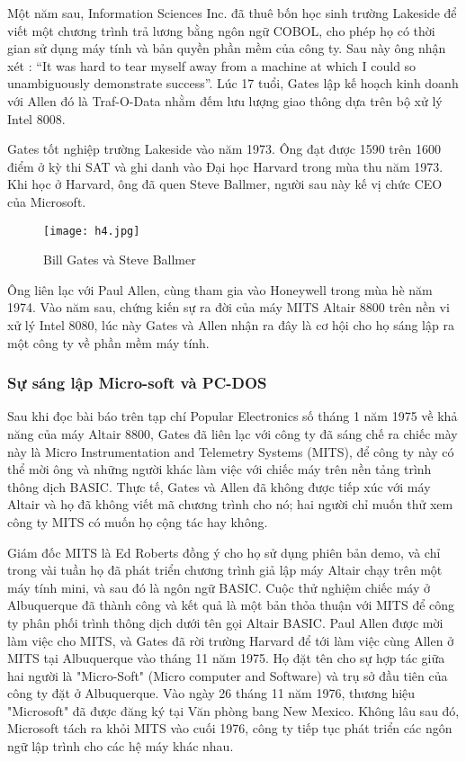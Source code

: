 \documentclass[12pt,a4paper]{article}  %
\begin{document}
	\noindent Một năm sau, Information Sciences Inc. đã thuê bốn học sinh trường Lakeside để viết một chương trình trả lương bằng ngôn ngữ COBOL, cho phép họ có thời gian sử dụng máy tính và bản quyền phần mềm của công ty. Sau này ông nhận xét : \enquote{It was hard to tear myself away from a machine at which I could so unambiguously demonstrate success}. Lúc 17 tuổi, Gates lập kế hoạch kinh doanh với Allen đó là Traf-O-Data nhằm đếm lưu lượng giao thông dựa trên bộ xử lý Intel 8008.
	
	\noindent Gates tốt nghiệp trường Lakeside vào năm 1973. Ông đạt được 1590 trên 1600 điểm ở kỳ thi SAT và ghi danh vào Đại học Harvard trong mùa thu năm 1973. Khi học ở Harvard, ông đã quen Steve Ballmer, người sau này kế vị chức CEO của Microsoft.
	\begin{figure}[h!]
	\centering
	\texttt{[image: h4.jpg]}
	\captionsetup{labelformat=empty}
	\caption{Bill Gates và Steve Ballmer}
	\end{figure}
	
	\noindent Ông liên lạc với Paul Allen, cùng tham gia vào Honeywell trong mùa hè năm 1974. Vào năm sau, chứng kiến sự ra đời của máy MITS Altair 8800 trên nền vi xử lý Intel 8080, lúc này Gates và Allen nhận ra đây là cơ hội cho họ sáng lập ra một công ty về phần mềm máy tính.
	\subsubsection{Sự sáng lập Micro-soft và PC-DOS}
	Sau khi đọc bài báo trên tạp chí Popular Electronics số tháng 1 năm 1975 về khả năng của máy Altair 8800, Gates đã liên lạc với công ty đã sáng chế ra chiếc mày này là Micro Instrumentation and Telemetry Systems (MITS), để công ty này có thể mời ông và những người khác làm việc với chiếc máy trên nền tảng trình thông dịch BASIC. Thực tế, Gates và Allen đã không được tiếp xúc với máy Altair và họ đã không viết mã chương trình cho nó; hai người chỉ muốn thử xem công ty MITS có muốn họ cộng tác hay không.
	
	\noindent
	 Giám đốc MITS là Ed Roberts đồng ý cho họ sử dụng phiên bản demo, và chỉ trong vài tuần họ đã phát triển chương trình giả lập máy Altair chạy trên một máy tính mini, và sau đó là ngôn ngữ BASIC. Cuộc thử nghiệm chiếc máy ở Albuquerque đã thành công và kết quả là một bản thỏa thuận với MITS để công ty phân phối trình thông dịch dưới tên gọi Altair BASIC. Paul Allen được mời làm việc cho MITS, và Gates đã rời trường Harvard để tới làm việc cùng Allen ở MITS tại Albuquerque vào tháng 11 năm 1975. Họ đặt tên cho sự hợp tác giữa hai người là "Micro-Soft" (Micro computer and Software) và trụ sở đầu tiên của công ty đặt ở Albuquerque. Vào ngày 26 tháng 11 năm 1976, thương hiệu "Microsoft" đã được đăng ký tại Văn phòng bang New Mexico. Không lâu sau đó, Microsoft tách ra khỏi MITS vào cuối 1976, công ty tiếp tục phát triển các ngôn ngữ lập trình cho các hệ máy khác nhau.
	
\end{document}
